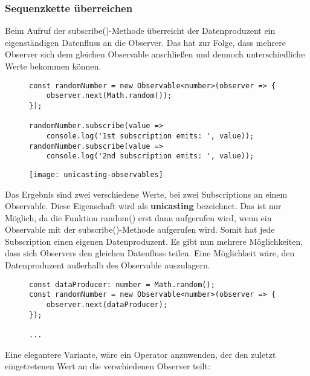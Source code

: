 \subsubsection{Sequenzkette überreichen}

Beim Aufruf der subscribe()-Methode überreicht der Datenproduzent ein eigenständigen Datenfluss an die Observer. Das hat zur Folge, dass mehrere Observer sich dem gleichen Observable anschließen und dennoch unterschiedliche Werte bekommen können.

\begin{figure}[H]
\begin{lstlisting}[basicstyle=\small]
const randomNumber = new Observable<number>(observer => {
    observer.next(Math.random());
});

randomNumber.subscribe(value =>
    console.log('1st subscription emits: ', value));
randomNumber.subscribe(value =>
    console.log('2nd subscription emits: ', value));
\end{lstlisting}
\end{figure}

\begin{figure}[H]
\begin{center}
\texttt{[image: unicasting-observables]}
\end{center}
\end{figure}
\noindent
Das Ergebnis sind zwei verschiedene Werte, bei zwei Subscriptions an einem Observable. Diese Eigenschaft wird als \textbf{unicasting} bezeichnet. Das ist nur Möglich, da die Funktion random() erst dann aufgerufen wird, wenn ein Observable mit der subscribe()-Methode aufgerufen wird. Somit hat jede Subscription einen eigenen Datenproduzent. Es gibt nun mehrere Möglichkeiten, dass sich Observers den gleichen Datenfluss teilen. Eine Möglichkeit wäre, den Datenproduzent außerhalb des Observable auszulagern. 

\begin{figure}[H]
\begin{lstlisting}[basicstyle=\small]
const dataProducer: number = Math.random();
const randomNumber = new Observable<number>(observer => {
    observer.next(dataProducer);
});

...
\end{lstlisting}
\end{figure}

\noindent
Eine elegantere Variante, wäre ein Operator anzuwenden, der den zuletzt eingetretenen Wert an die verschiedenen Observer teilt:

